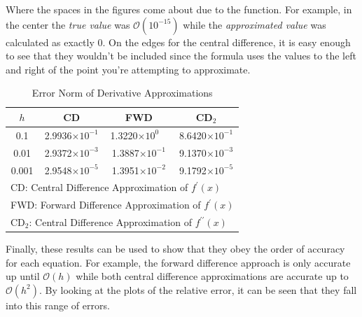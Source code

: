 \documentclass[addpoints]{exam}
\begin{document}
\begin{questions}
\begin{solution}
Where the spaces in the figures come about due to the function. For example, in the center the {\em true value} was $\mathcal{O}\left(10^{-15}\right)$ while the {\em approximated value} was calculated as exactly $0$. On the edges for the central difference, it is easy enough to see that they wouldn't be included since the formula uses the values to the left and right of the point you're attempting to approximate.

\begin{table}[H]
\centering
\caption{Error Norm of Derivative Approximations}
\begin{tabular}{c c c c}
\hline\hline
$h$ & CD & FWD & CD$_{2}$\\
\hline
0.1\phantom{00} & 2.9936$\times 10^{-1}$ & 1.3220$\times 10^{0\phantom{-}}$ & 8.6420$\times 10^{-1}$\\
0.01\phantom{0} & 2.9372$\times 10^{-3}$ & 1.3887$\times 10^{-1}$ & 9.1370$\times 10^{-3}$\\
0.001 & 2.9548$\times 10^{-5}$ & 1.3951$\times 10^{-2}$ & 9.1792$\times 10^{-5}$\\
\hline\hline
\multicolumn{4}{l}{{\scriptsize CD: Central Difference Approximation of $f^{\prime}(x)$}}\\
\multicolumn{4}{l}{{\scriptsize FWD: Forward Difference Approximation of $f^{\prime}(x)$}}\\
\multicolumn{4}{l}{{\scriptsize CD$_{2}$: Central Difference Approximation of $f^{\prime \prime}(x)$}}\\
\end{tabular}
\end{table}

Finally, these results can be used to show that they obey the order of accuracy for each equation. For example, the forward difference approach is only accurate up until $\mathcal{O}(h)$ while both central difference approximations are accurate up to $\mathcal{O}\left(h^{2}\right)$. By looking at the plots of the relative error, it can be seen that they fall into this range of errors.

\end{solution}
\end{questions}

\end{document}
